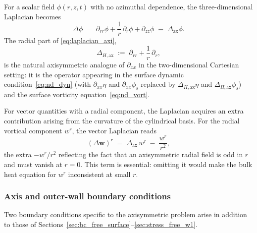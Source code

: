 \documentclass{article}
\newcommand{\ww}{\mathbf{w}}
\begin{document}
For a scalar field $\phi(r, z, t)$ with no azimuthal dependence, the three-dimensional Laplacian becomes
\begin{equation}
    \Delta\phi \;=\; \partial_{rr}\phi + \frac{1}{r}\,\partial_r\phi + \partial_{zz}\phi
              \;\equiv\; \Delta_{\mathrm{ax}}\phi.
    \label{eq:laplacian_axi}
\end{equation}
The radial part of \eqref{eq:laplacian_axi},
\begin{equation}
    \Delta_{H,\mathrm{ax}} \;:=\; \partial_{rr} + \frac{1}{r}\,\partial_r,
    \label{eq:Delta_H_axi_def}
\end{equation}
is the natural axisymmetric analogue of $\partial_{xx}$ in the two-dimensional Cartesian setting: it is the operator appearing in the surface dynamic condition~\eqref{eq:nd_dyn} (with $\partial_{xx}\eta$ and $\partial_{xx}\phi_s$ replaced by $\Delta_{H,\mathrm{ax}}\eta$ and $\Delta_{H,\mathrm{ax}}\phi_s$) and the surface vorticity equation~\eqref{eq:nd_vort}.

For vector quantities with a radial component, the Laplacian acquires an extra contribution arising from the curvature of the cylindrical basis.
For the radial vortical component $w^r$, the vector Laplacian reads
\begin{equation}
    (\Delta \ww)^r \;=\; \Delta_{\mathrm{ax}}\, w^r \;-\; \frac{w^r}{r^2},
    \label{eq:vector_laplacian_wr}
\end{equation}
the extra $-w^r/r^2$ reflecting the fact that an axisymmetric radial field is odd in $r$ and must vanish at $r = 0$.
This term is essential: omitting it would make the bulk heat equation for $w^r$ inconsistent at small $r$.

\subsubsection{Axis and outer-wall boundary conditions}
\label{sec:axisymm_BCs}

Two boundary conditions specific to the axisymmetric problem arise in addition to those of Sections~\ref{sec:bc_free_surface}--\ref{sec:stress_free_w1}.
\end{document}
